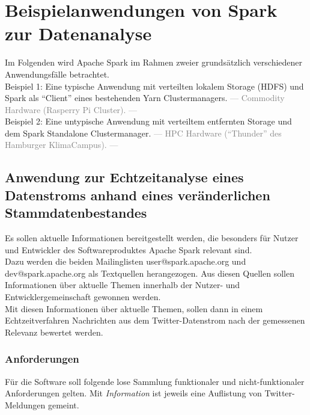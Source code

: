 \chapter{Beispielanwendungen von Spark zur Datenanalyse}
Im Folgenden wird Apache Spark im Rahmen zweier grundsätzlich verschiedener Anwendungsfälle betrachtet. \\

Beispiel 1: Eine typische Anwendung mit verteilten lokalem Storage (HDFS) und Spark als "`Client"' eines bestehenden Yarn Clustermanagers. \textcolor{gray}{--- Commodity Hardware (Rasperry Pi Cluster). ---}\\


Beispiel 2: Eine untypische Anwendung mit verteiltem entfernten Storage und dem Spark Standalone Clustermanager. \textcolor{gray}{--- HPC Hardware ("`Thunder"' des Hamburger KlimaCampus). ---}\\

\section{Anwendung zur Echtzeitanalyse eines Datenstroms anhand eines veränderlichen Stammdatenbestandes}

Es sollen aktuelle Informationen bereitgestellt werden, die besonders für Nutzer und Entwickler des Softwareproduktes Apache Spark relevant sind.\\

Dazu werden die beiden Mailinglisten user@spark.apache.org und dev@spark.apache.org als Textquellen herangezogen. Aus diesen Quellen sollen Informationen über aktuelle Themen innerhalb der Nutzer- und Entwicklergemeinschaft gewonnen werden.\\

Mit diesen Informationen über aktuelle Themen, sollen dann in einem Echtzeitverfahren Nachrichten aus dem Twitter-Datenstrom nach der gemessenen Relevanz bewertet werden.

\subsection{Anforderungen}

Für die Software soll folgende lose Sammlung funktionaler und nicht-funktionaler Anforderungen gelten. Mit \textit{Information} ist jeweils eine Auflistung von Twitter-Meldungen gemeint.

